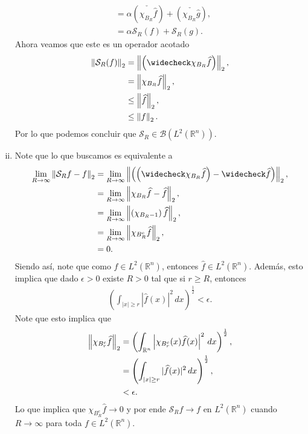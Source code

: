 \begin{homeworkProblem}
\begin{solution}
\begin{enumerate}[(i)]
\begin{align*}
          &=\alpha \left( \check{\chi_{B_{R}}\hat{f}} \right)+\left( \check{\chi_{B_{R}}\hat{g}} \right),\\
          &=\alpha \mathcal{S}_{R}(f)+\mathcal{S}_{R}(g).
        \end{align*}
        Ahora veamos que este es un operador acotado
        \begin{align*}
          \norm{\mathcal{S}_{R}(f)}_{2}&=\norm{\left( \check{\chi_{B_{R}}\hat{f}} \right)}_{2},\\
          &=\norm{\chi_{B_{R}}\hat{f}}_{2},\\
          &\leq\norm{\hat{f}}_{2},\\
          &\leq \norm{f}_{2}.
        \end{align*}
        Por lo que podemos concluir que $\mathcal{S}_{R}\in \mathcal{B}(L^2(\mathbb{R}^{n}))$.
      \item Note que lo que buscamos es equivalente a
        \begin{align*}
          \lim_{R \to \infty}\norm{\mathcal{S}_{R}f-f}_{2}&=\lim_{R \to \infty}\norm{\left( \left( \check{\chi_{B_{R}}\hat{f}} \right)-\check{\hat{f}} \right)}_{2},\\
          &=\lim_{R \to \infty}\norm{\chi_{B_{R}}\hat{f}-\hat{f}}_{2},\\
          &=\lim_{R \to \infty}\norm{\left( \chi_{B_{R}-1} \right)\hat{f}}_{2},\\
          &=\lim_{R \to \infty}\norm{\chi_{B_{R}^{c}}\hat{f}}_{2},\\
          &=0.
        \end{align*}
        Siendo así, note que como $f\in L^2(\mathbb{R}^{n})$, entonces $\hat{f}\in L^2(\mathbb{R}^{n})$. Además, esto implica que dado $\epsilon>0$ existe $R>0$ tal que si $r\geq R$, entonces
        \begin{align*}
          \left(\int_{|x|\geq r}|\hat{f}(x)|^2\, dx\right)^{\frac{1}{2}} <\epsilon.
        \end{align*}
        Note que esto implica que
        \begin{align*}
          \left\|\chi_{B_{r}^c}\widehat{f}\right\|_{2}&=\left(\int_{\mathbb{R}^{n}}\left|\chi_{B_{r}^c}(x)\widehat{f}(x)\right|^2\, dx\right)^{\frac{1}{2}},\\
          &=\left(\int_{|x|\geq r}|\widehat{f}(x)|^2\, dx\right)^{\frac{1}{2}},\\
          &< \epsilon.
        \end{align*}
        Lo que implica que $\chi_{B_{R}^{c}}\hat{f}\to 0$ y por ende $\mathcal{S}_{R}f\to f$ en $L^2(\mathbb{R}^{n})$ cuando $R\to\infty$ para toda $f\in L^2(\mathbb{R}^{n})$.

\end{enumerate}
\end{solution}
\end{homeworkProblem}
